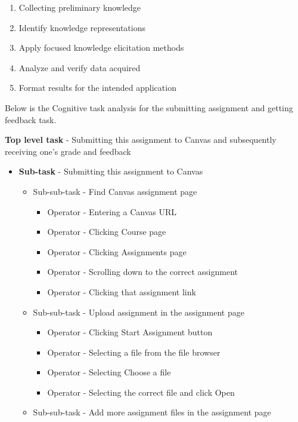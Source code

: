 \documentclass[
	letterpaper, %
]{jdf}
\begin{document}
\begin{enumerate}
	\item Collecting preliminary knowledge
	\item Identify knowledge representations
	\item Apply focused knowledge elicitation methods
	\item Analyze and verify data acquired
	\item Format results for the intended application
\end{enumerate}

Below is the Cognitive task analysis for the submitting assignment and getting feedback task.

\textbf{Top level task} - Submitting this assignment to Canvas and subsequently receiving one’s grade and feedback
\begin{itemize}
    \item \textbf{Sub-task} - Submitting this assignment to Canvas
        \begin{itemize}
            \item Sub-sub-task - Find Canvas assignment page
                \begin{itemize}
                    \item Operator - Entering a Canvas URL
                    \item Operator - Clicking Course page
                    \item Operator - Clicking Assignments page
                    \item Operator - Scrolling down to the correct assignment
                    \item Operator - Clicking that assignment link
                \end{itemize}
            \item Sub-sub-task - Upload assignment in the assignment page
                \begin{itemize}
                    \item Operator - Clicking Start Assignment button
                    \item Operator - Selecting a file from the file browser
                    \item Operator - Selecting Choose a file
                    \item Operator - Selecting the correct file and click Open
                \end{itemize}
            \item Sub-sub-task - Add more assignment files in the assignment page

\end{itemize}
\end{itemize}
\end{document}
